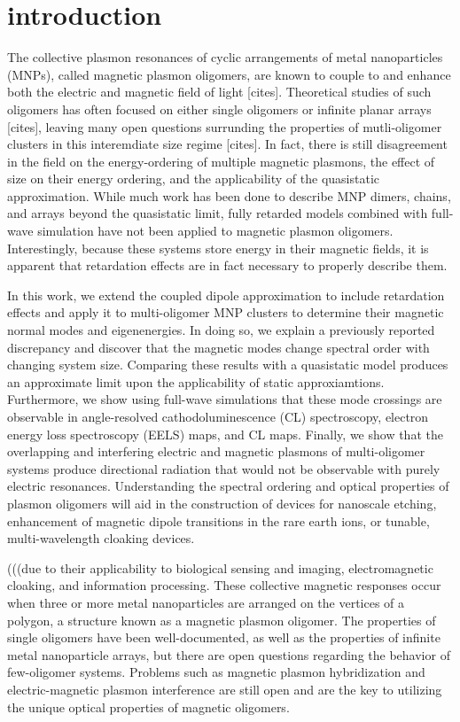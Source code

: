 \documentclass[journal=apchd5,manuscript=article]{achemso}
\begin{document}
\section{introduction}
The collective plasmon resonances of cyclic arrangements of metal nanoparticles (MNPs), called magnetic plasmon oligomers, are known to couple to and enhance both the electric and magnetic field of light [cites]. Theoretical studies of such oligomers has often focused on either single oligomers or infinite planar arrays [cites], leaving many open questions surrunding the properties of mutli-oligomer clusters in this interemdiate size regime [cites]. In fact, there is still disagreement in the field on the energy-ordering of multiple magnetic plasmons, the effect of size on their energy ordering, and the applicability of the quasistatic approximation. While much work has been done to describe MNP dimers, chains, and arrays beyond the quasistatic limit, fully retarded models combined with full-wave simulation have not been applied to magnetic plasmon oligomers. Interestingly, because these systems store energy in their magnetic fields, it is apparent that retardation effects are in fact necessary to properly describe them.

In this work, we extend the coupled dipole approximation to include retardation effects and apply it to multi-oligomer MNP clusters to determine their magnetic normal modes and eigenenergies. In doing so, we explain a previously reported discrepancy and discover that the magnetic modes change spectral order with changing system size. Comparing these results with a quasistatic model produces an approximate limit upon the applicability of static approxiamtions. Furthermore, we show using full-wave simulations that these mode crossings are observable in angle-resolved cathodoluminescence (CL) spectroscopy, electron energy loss spectroscopy (EELS) maps, and CL maps. Finally, we show that the overlapping and interfering electric and magnetic plasmons of multi-oligomer systems produce directional radiation that would not be observable with purely electric resonances. Understanding the spectral ordering and optical properties of plasmon oligomers will aid in the construction of devices for nanoscale etching, enhancement of magnetic dipole transitions in the rare earth ions, or tunable, multi-wavelength cloaking devices.

(((due to their applicability to biological sensing and imaging, electromagnetic cloaking, and information processing\cite{Zia2010trans,Noginova2008trans,Wang:13,Fan2015,Wei2015,Shvets2012,Altug2012bio,Nord2011fano,Zhang2006,NordHal2011,NordHal2012}. These collective magnetic responses occur when three or more metal nanoparticles are arranged on the vertices of a polygon, a structure known as a magnetic plasmon oligomer. The properties of single oligomers have been well-documented, as well as the properties of infinite metal nanoparticle arrays, but there are open questions regarding the behavior of few-oligomer systems.\cite{Dionne2011,Dionne2016,Weick2013,Engheta2017,Cherqui2014,Cherqui2016} Problems such as magnetic plasmon hybridization and electric-magnetic plasmon interference are still open and are the key to utilizing the unique optical properties of magnetic oligomers.
\end{document}
